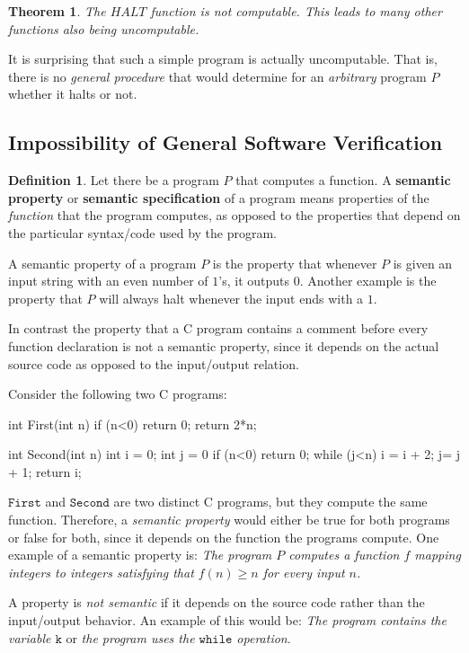 \documentclass[a4paper, 12pt]{report}
\newtheorem{theorem}{Theorem}[section]
\theoremstyle{remark}
\theoremstyle{definition}
\newtheorem{definition}{Definition}[section]
\begin{document}
\begin{theorem}
The $HALT$ function is not computable. This leads to many other functions also being uncomputable. 
\end{theorem}

It is surprising that such a simple program is actually uncomputable. That is, there is no \textit{general procedure} that would determine for an \textit{arbitrary} program $P$ whether it halts or not. 

\subsection{Impossibility of General Software Verification}
\begin{definition}
Let there be a program $P$ that computes a function. A \textbf{semantic property} or \textbf{semantic specification} of a program means properties of the \textit{function} that the program computes, as opposed to the properties that depend on the particular syntax/code used by the program. 
\end{definition}

\begin{example}
A semantic property of a program $P$ is the property that whenever $P$ is given an input string with an even number of $1$'s, it outputs $0$. Another example is the property that $P$ will always halt whenever the input ends with a $1$. 

In contrast the property that a C program contains a comment before every function declaration is not a semantic property, since it depends on the actual source code as opposed to the input/output relation. 
\end{example}

\begin{example}
Consider the following two C programs: 
\begin{python}
int First(int n) {
    if (n<0) return 0; 
    return 2*n;
}

int Second(int n) {
    int i = 0;
    int j = 0
    if (n<0) return 0; 
    while (j<n) {
        i = i + 2;
        j= j + 1; 
    }
    return i; 
}
\end{python}
$\texttt{First}$ and $\texttt{Second}$ are two distinct C programs, but they compute the same function. Therefore, a \textit{semantic property} would either be true for both programs or false for both, since it depends on the function the programs compute. One example of a semantic property is: \textit{The program $P$ computes a function $f$ mapping integers to integers satisfying that $f(n) \geq n$ for every input $n$.} 

A property is \textit{not semantic} if it depends on the source code rather than the input/output behavior. An example of this would be: \textit{The program contains the variable $\texttt{k}$} or \textit{the program uses the $\texttt{while}$ operation}. 
\end{example}
\end{document}
